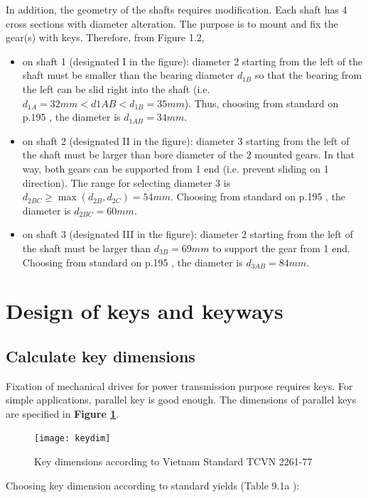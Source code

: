 In addition, the geometry of the shafts requires modification. Each shaft has 4 cross sections with diameter alteration. The purpose is to mount and fix the gear(s) with keys. Therefore, from Figure 1.2,
\begin{itemize}
	\item on shaft 1 (designated I in the figure): diameter 2 starting from the left of the shaft must be smaller than the bearing diameter $ d_{1B} $ so that the bearing from the left can be slid right into the shaft (i.e. $ d_{1A} = 32 \unit{mm} < d{1AB} < d_{1B} = 35 \unit{mm} $). Thus, choosing from standard on p.195 \cite{tk1}, the diameter is $ d_{1AB} = 34 \unit{mm} $.
	\item on shaft 2 (designated II in the figure): diameter 3 starting from the left of the shaft must be larger than bore diameter of the 2 mounted gears. In that way, both gears can be supported from 1 end (i.e. prevent sliding on 1 direction). The range for selecting diameter 3 is $ d_{2BC} \geq \max(d_{2B}, d_{2C}) = 54 \unit{mm} $. Choosing from standard on p.195 \cite{tk1}, the diameter is $ d_{2BC} = 60 \unit{mm} $.
	\item on shaft 3 (designated III in the figure): diameter 2 starting from the left of the shaft must be larger than $ d_{3B} = 69 \unit{mm} $ to support the gear from 1 end. Choosing from standard on p.195 \cite{tk1}, the diameter is $ d_{3AB} = 84 \unit{mm} $.
\end{itemize}
\clearpage

\section{Design of keys and keyways}
\subsection{Calculate key dimensions}

Fixation of mechanical drives for power transmission purpose requires keys. For simple applications, parallel key is good enough. The dimensions of parallel keys are specified in \textbf{Figure \ref{keydim}}.

\begin{figure}[ht]
	\centering
	\texttt{[image: keydim]}
	\caption{Key dimensions according to Vietnam Standard TCVN 2261-77}
	\label{keydim}
\end{figure}

Choosing key dimension according to standard yields (Table 9.1a \cite{tk1}):

